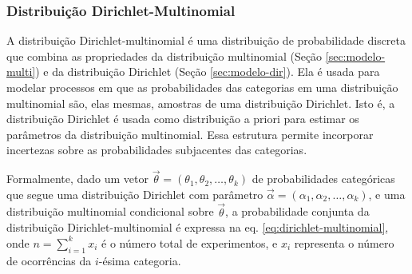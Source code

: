 






\subsubsection{Distribuição Dirichlet-Multinomial}
\label{sec:modelo-dir-multi}

A distribuição Dirichlet-multinomial \cite{distbook-dirichlet} é uma distribuição de probabilidade discreta que combina as propriedades da distribuição multinomial (Seção \ref{sec:modelo-multi}) e da distribuição Dirichlet (Seção \ref{sec:modelo-dir}). Ela é usada para modelar processos em que as probabilidades das categorias em uma distribuição multinomial são, elas mesmas, amostras de uma distribuição Dirichlet. Isto é, a distribuição Dirichlet é usada como distribuição a priori para estimar os parâmetros da distribuição multinomial. Essa estrutura permite incorporar incertezas sobre as probabilidades subjacentes das categorias.

Formalmente, dado um vetor \( \vec{\theta} = (\theta_1, \theta_2, \dots, \theta_k) \) de probabilidades categóricas que segue uma distribuição Dirichlet com parâmetro \( \vec{\alpha} = (\alpha_1, \alpha_2, \dots, \alpha_k) \), e uma distribuição multinomial condicional sobre \( \vec{\theta} \), a probabilidade conjunta da distribuição Dirichlet-multinomial é expressa na eq. \eqref{eq:dirichlet-multinomial}, onde \( n = \sum_{i=1}^k x_i \) é o número total de experimentos, e \( x_i \) representa o número de ocorrências da \( i \)-ésima categoria.

